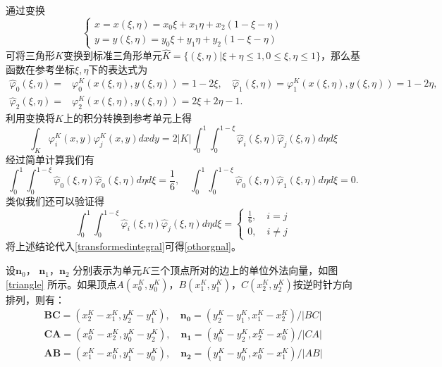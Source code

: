 \documentclass[a4paper, 12pt, UTF8]{ctexart}
\newcommand{\bs}[1]{\boldsymbol{#1}}
\begin{document}
通过变换
\begin{equation}
\begin{cases}
\displaystyle x=x(\xi,\eta)=x_0\xi+x_1\eta+x_2(1-\xi-\eta)\\
\displaystyle y=y(\xi,\eta)=y_0\xi+y_1\eta+y_2(1-\xi-\eta)
\end{cases}
\end{equation}
可将三角形$K$变换到标准三角形单元$\widehat K=\{(\xi, \eta)| \xi+\eta\leq 1, 0\leq \xi,\eta \leq 1\}$，那么基函数在参考坐标$\xi,\eta$下的表达式为
\begin{equation}
\begin{split}
	\hat\varphi_0(\xi,\eta)=&\varphi_0^K(x(\xi,\eta),y(\xi,\eta))=1-2\xi, \quad \hat\varphi_1(\xi,\eta)=\varphi_1^K(x(\xi,\eta),y(\xi,\eta))=1-2\eta,\\ \hat\varphi_2(\xi,\eta)=&\varphi_2^K(x(\xi,\eta),y(\xi,\eta))=2\xi+2\eta-1.
\end{split}
\end{equation}
利用变换将$K$上的积分转换到参考单元上得
\begin{equation}\label{transformedintegral}
\int_K\varphi_i^K(x, y)\varphi_j^K(x, y)dxdy=2|K|\int_0^1\int_{0}^{1-\xi}\hat\varphi_i(\xi,\eta)\hat\varphi_j(\xi,\eta)d\eta d\xi
\end{equation}
经过简单计算我们有
\begin{equation}
\int_0^1\int_{0}^{1-\xi}\hat\varphi_0(\xi,\eta)\hat\varphi_0(\xi,\eta)d\eta d\xi =\frac{1}{6},\quad \int_0^1\int_{0}^{1-\xi}\hat\varphi_0(\xi,\eta)\hat\varphi_1(\xi,\eta)d\eta d\xi =0.
\end{equation}
类似我们还可以验证得
\begin{equation}
\int_0^1\int_{0}^{1-\xi}\hat\varphi_i(\xi,\eta)\hat\varphi_j(\xi,\eta)d\eta d\xi =\begin{cases}
\displaystyle\frac{1}{6},\quad i=j\\
\displaystyle 0,\quad i\neq j
\end{cases}
\end{equation}
将上述结论代入\eqref{transformedintegral}可得\eqref{othorgnal}。


设$\bs n_{0}$， $\bs n_{1}$，$\bs n_{2}$ 分别表示为单元$K$三个顶点所对的边上的单位外法向量，如图 \ref{triangle} 所示。如果顶点$A(x_0^K, y_0^K)$，$B(x_1^K, y_1^K)$，$C(x_2^K, y_2^K)$按逆时针方向排列，则有：
\begin{equation}
\begin{split}
\bs{B C}=\left(x_{2}^K-x_{1}^K, y_{2}^K-y_{1}^K\right),\quad \bs{n_{0}}=\left(y_{2}^K-y_{1}^K, x_{1}^K-x_{2}^K\right) /|BC|\\
\bs{C A}=\left(x_{0}^K-x_{2}^K, y_{0}^K-y_{2}^K\right),\quad \bs{n_{1}}=\left(y_{0}^K-y_{2}^K, x_{2}^K-x_{0}^K\right) /|CA|\\
\bs{A B}=\left(x_{1}^K-x_{0}^K, y_{1}^K-y_{0}^K\right), \quad \bs{n_{2}}=\left(y_{1}^K-y_{0}^K, x_{0}^K-x_{1}^K\right) /|AB|
\end{split}
\end{equation}
\end{document}
